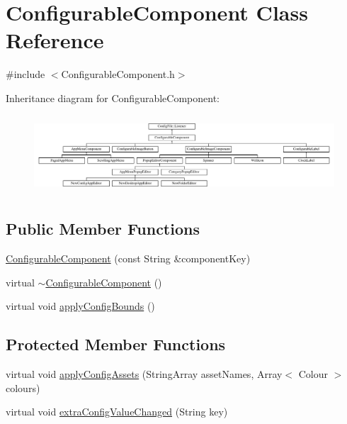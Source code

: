 \hypertarget{classConfigurableComponent}{}\section{Configurable\+Component Class Reference}
\label{classConfigurableComponent}


{\ttfamily \#include $<$Configurable\+Component.\+h$>$}

Inheritance diagram for Configurable\+Component\+:\begin{figure}[H]
\begin{center}
\leavevmode
\includegraphics[height=2.962963cm]{classConfigurableComponent}
\end{center}
\end{figure}
\subsection*{Public Member Functions}
\begin{DoxyCompactItemize}
\item 
\mbox{\hyperlink{classConfigurableComponent_ad3ba70fac3d8420b25b0005e406dd30c}{Configurable\+Component}} (const String \&component\+Key)
\item 
virtual \mbox{\hyperlink{classConfigurableComponent_ab5b5120910e7579e9209fde6065e3d38}{$\sim$\+Configurable\+Component}} ()
\item 
virtual void \mbox{\hyperlink{classConfigurableComponent_ad6a11482af604e0f93699c1c24e39fba}{apply\+Config\+Bounds}} ()
\end{DoxyCompactItemize}
\subsection*{Protected Member Functions}
\begin{DoxyCompactItemize}
\item 
virtual void \mbox{\hyperlink{classConfigurableComponent_a394fbc2f6a8b3dc9210464d3d6efa212}{apply\+Config\+Assets}} (String\+Array asset\+Names, Array$<$ Colour $>$ colours)
\item 
virtual void \mbox{\hyperlink{classConfigurableComponent_ab6a55a5e7aff6798bdbc5cafa85443d4}{extra\+Config\+Value\+Changed}} (String key)
\end{DoxyCompactItemize}


